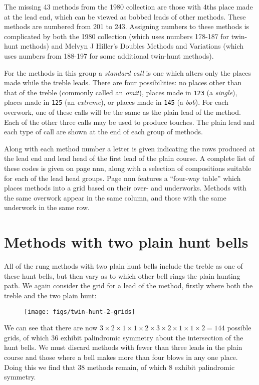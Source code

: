 The missing 43 methods from the 1980 collection are those with 4ths place made
at the lead end, which can be viewed as bobbed leads of other methods.
These methods are numbered from 201 to 243.
Assigning numbers to these methods is complicated by both the 1980 collection
(which uses numbers 178-187 for twin-hunt methods)
and Melvyn J Hiller’s Doubles Methods and Variations
(which uses numbers from 188-197 for some additional twin-hunt methods).

For the methods in this group a \emph{standard call} is one which alters only
the places made while the treble leads.
There are four possibilities:
no places other than that of the treble (commonly called an \emph{omit}),
places made in {\tt 123} (a \emph{single}),
places made in {\tt 125} (an \emph{extreme}),
or places made in {\tt 145} (a \emph{bob}).
For each overwork,
one of these calls will be the same as the plain lead of the method.
Each of the other three calls may be used to produce touches.
The plain lead and each type of call are shown at the end of each group of
methods.

Along with each method number a letter is given indicating the rows produced at
the lead end and lead head of the first lead of the plain course.
A complete list of these codes is given on page nnn,
along with a selection of compositions suitable for each of the lead head
groups.
Page nnn features a “four-way table” which places methods into a grid based on
their over- and underworks.
Methods with the same overwork appear in the same column,
and those with the same underwork in the same row.

\section{Methods with two plain hunt bells} \label{sec:intro-double-hunt}

All of the rung methods with two plain hunt bells include the treble as one of
these hunt bells,
but then vary as to which other bell rings the plain hunting path.
We again consider the grid for a lead of the method,
firstly where both the treble and the two plain hunt:

\begin{figure}[h]
  \centering
  \texttt{[image: figs/twin-hunt-2-grids]}
\end{figure}

We can see that there are now
\(3\times2\times1\times1\times2\times3\times2\times1\times1\times 2 = 144\)
possible grids, of which 36 exhibit palindromic symmetry about the intersection
of the hunt bells.
We must discard methods with fewer than three leads in the plain course and
those where a bell makes more than four blows in any one place.
Doing this we find that 38 methods remain,
of which 8 exhibit palindromic symmetry.

